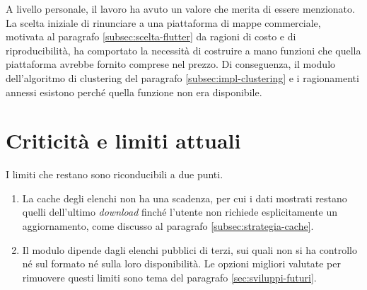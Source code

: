 A livello personale, il lavoro ha avuto un valore che merita di essere menzionato.
La scelta iniziale di rinunciare a una piattaforma di mappe commerciale, motivata al paragrafo \ref{subsec:scelta-flutter} da
ragioni di costo e di riproducibilità, ha comportato la necessità di costruire a mano funzioni che quella piattaforma avrebbe fornito
comprese nel prezzo.
Di conseguenza, il modulo dell'algoritmo di clustering del paragrafo \ref{subsec:impl-clustering}
e i ragionamenti annessi esistono perché quella funzione non era disponibile.

\section{Criticità e limiti attuali}\label{sec:limiti-attuali}

I limiti che restano sono riconducibili a due punti.
\begin{enumerate}
    \item La cache degli elenchi non ha una scadenza, per cui i dati mostrati restano quelli dell'ultimo \textit{download} finché l'utente
    non richiede esplicitamente un aggiornamento, come discusso al paragrafo \ref{subsec:strategia-cache}.
    \item Il modulo dipende dagli elenchi pubblici di terzi, sui quali non si ha controllo né sul formato né sulla loro disponibilità.
    Le opzioni migliori valutate per rimuovere questi limiti sono tema del paragrafo \ref{sec:sviluppi-futuri}.
\end{enumerate}

